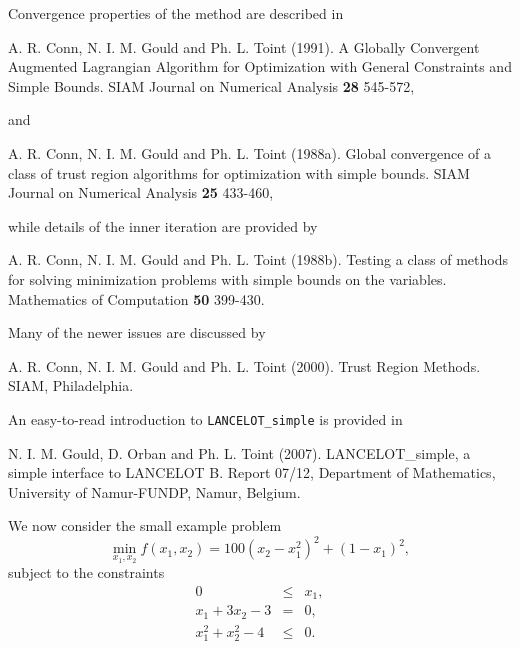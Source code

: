 \documentclass{galahad}
\begin{document}
Convergence properties of the method are described in

\noindent
A. R. Conn, N. I. M. Gould and Ph. L. Toint (1991).
A Globally Convergent Augmented {L}agrangian Algorithm for
Optimization with General Constraints and Simple Bounds.
SIAM Journal on Numerical Analysis {\bf 28} 545-572,

\noindent
and

\noindent
A. R. Conn, N. I. M. Gould and Ph. L. Toint (1988a).
Global convergence of a class of trust region algorithms
for optimization with simple bounds.
SIAM Journal on Numerical Analysis {\bf 25} 433-460,

\noindent
while details of the inner iteration are provided by

\noindent
A. R. Conn, N. I. M. Gould and Ph. L. Toint (1988b).
Testing a class of methods for solving minimization
problems with simple bounds on the variables.
Mathematics of Computation {\bf 50} 399-430.

Many of the newer issues are discussed by

\noindent
A. R. Conn, N. I. M. Gould and Ph. L. Toint (2000).
Trust Region Methods.
SIAM, Philadelphia.

\noindent
An easy-to-read introduction to {\tt LANCELOT\_simple} is provided in

\noindent
N. I. M. Gould, D. Orban and Ph. L. Toint (2007).
LANCELOT\_simple, a simple interface to LANCELOT B.
Report 07/12, Department of Mathematics, University of Namur-FUNDP, Namur,
Belgium.


\galexample
We now consider the small example problem
\[
\min_{x_1,x_2 } f( x_1, x_2 ) = 100 ( x_2 - x_1^2 )^2 + ( 1 - x_1 )^2,    
\]
subject to the constraints
\[
\begin{array}{rcl}
0  & \leq & x_1, \\
x_1 + 3x_2   - 3  &  = &  0,\\
x_1^2 + x_2^2 - 4 &  \leq & 0.
\end{array}
\]                                          
\end{document}

